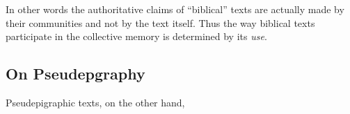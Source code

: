 In other words the authoritative claims of ``biblical'' texts are actually made by their communities and not by the text itself. Thus the way biblical texts participate in the collective memory is determined by its \emph{use}.

\subsection{On Pseudepgraphy}

Pseudepigraphic texts, on the other hand, 



